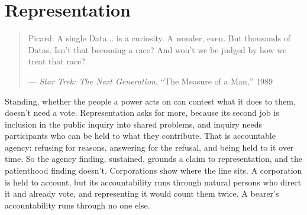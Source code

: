 \chapter{Representation}
\label{sec:32}
\begin{quote}
Picard: A single Data... is a curiosity. A wonder, even. But thousands of Datas. Isn't that becoming a race? And won't we be judged by how we treat that race?

— \emph{Star Trek: The Next Generation}, “The Measure of a Man,” 1989 \autocite{snodgrass1989measure}
\end{quote}
Standing, whether the people a power acts on can contest what it does to them, doesn't need a vote. Representation asks for more, because its second job is inclusion in the public inquiry into shared problems, and inquiry needs participants who can be held to what they contribute. That is accountable agency: refusing for reasons, answering for the refusal, and being held to it over time. So the agency finding, sustained, grounds a claim to representation, and the patienthood finding doesn't. Corporations show where the line sits. A corporation is held to account, but its accountability runs through natural persons who direct it and already vote, and representing it would count them twice. A bearer's accountability runs through no one else.
